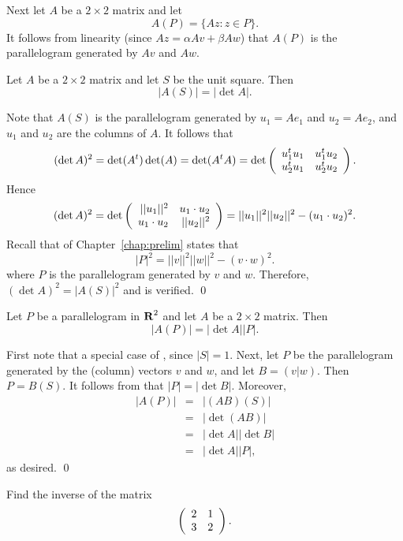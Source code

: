 Next let $A$ be a $2\times 2$ matrix and let
\[
A(P) = \{Az:z\in P\}.
\]
It follows from linearity (since $Az=\alpha Av+\beta Aw$) that $A(P)$ is the
parallelogram generated by $Av$ and $Aw$.

\begin{prop}  \label{P:det&area}
Let $A$ be a $2\times 2$ matrix and let $S$ be the unit square.  Then 
\begin{equation}  \label{e:det&area2}
|A(S)| = |\det A|.
\end{equation}
\end{prop}

\proof   Note that $A(S)$ is the parallelogram generated by $u_1=Ae_1$ and 
$u_2=Ae_2$, and $u_1$ and $u_2$ are the columns of $A$.  It follows that
\[
(\det A)^2=\det(A^t)\det(A)=\det(A^tA) =
\det\left(\begin{array}{rr} u_1^tu_1 & u_1^tu_2\\ u_2^tu_1 &u_2^tu_2\end{array}\right).
\]
Hence
\[
(\det A)^2=
\det\left(\begin{array}{rr} ||u_1||^2 & u_1\cdot u_2\\ u_1\cdot u_2 &||u_2||^2\end{array}\right) =
||u_1||^2||u_2||^2-(u_1\cdot u_2)^2.
\]
Recall that  of Chapter~\ref{chap:prelim} states that
\[
|P|^2 = ||v||^2||w||^2 - (v\cdot w)^2.
\]
where $P$ is the parallelogram generated by $v$ and $w$.  Therefore, 
$(\det A)^2 = |A(S)|^2$ and  is verified. \qed


\begin{thm}  \label{T:det&area}
Let $P$ be a parallelogram in $\mbox{$\bf{R}$}^2$ and let $A$ be a $2\times 2$
matrix.  Then
\begin{equation} \label{e:det&area}
|A(P)| = |\det A||P|.
\end{equation}
\end{thm}

\proof  First note that  a special case of , 
since $|S|=1$.   Next, let $P$ be the parallelogram generated by the (column)
vectors $v$ and $w$, and let $B=(v|w)$.  Then $P=B(S)$.  It
follows from  that $|P|=|\det B|$.  Moreover,
\begin{eqnarray*}
|A(P)| & = & |(AB)(S)| \\
& = & |\det(AB)| \\
& = & |\det A||\det B| \\
& = & |\det A||P|,
\end{eqnarray*}
as desired.  \qed

\EXER

\TEXER

\begin{exercise} \label{c4.9.1}
Find the inverse of the matrix
\[
\left(\begin{array}{rr} 2 & 1\\ 3 &2\end{array}\right).
\]
\end{exercise}

